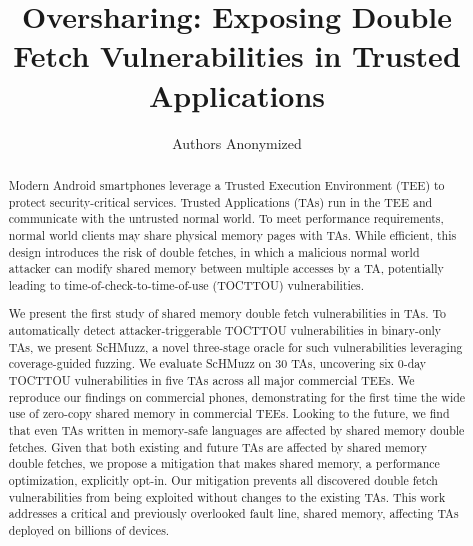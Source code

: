 \documentclass[conference]{IEEEtran}
\newcommand{\sysname}{ScHMuzz\xspace}
\newcommand{\numTAsharnessed}{30\xspace}
\newcommand{\numvulns}{six\xspace}
\newcommand{\numvulnTAs}{five\xspace}
\begin{document}

\date{}

\title{\Large \bf Oversharing: Exposing Double Fetch Vulnerabilities in Trusted Applications} 

\author
{Authors Anonymized
} %


\maketitle

\begin{abstract}

Modern Android smartphones leverage a Trusted Execution Environment (TEE) to 
protect security-critical services. Trusted Applications (TAs) run in the TEE and 
communicate with the untrusted normal world.
To meet performance requirements, normal world clients may share physical memory pages with 
TAs. While efficient, this design introduces the risk of double fetches, 
in which a malicious normal world attacker can modify shared memory between multiple accesses 
by a TA, potentially leading to time-of-check-to-time-of-use (TOCTTOU) vulnerabilities.

We present the first study of shared memory double fetch vulnerabilities in TAs. 
To automatically detect attacker-triggerable TOCTTOU  
vulnerabilities in binary-only TAs, we present \sysname, a novel three-stage oracle for such vulnerabilities 
leveraging coverage-guided fuzzing.
We evaluate \sysname on \numTAsharnessed{} TAs, uncovering \numvulns{} 
0-day TOCTTOU vulnerabilities in \numvulnTAs{} TAs across all major commercial TEEs. We reproduce 
our findings on commercial phones, demonstrating for the first time the wide use of zero-copy 
shared memory in commercial TEEs. Looking to the future, we find that even TAs 
written in memory-safe languages are affected by shared memory double fetches. 
Given that both existing and future TAs are affected by shared memory double fetches, we 
propose a mitigation that makes shared memory, a performance optimization, explicitly opt-in. Our mitigation 
prevents all discovered double fetch vulnerabilities from being exploited without 
changes to the existing TAs. 
This work addresses a critical and previously overlooked fault line, shared memory, 
affecting TAs deployed on billions of devices.

\end{abstract}
\end{document}
